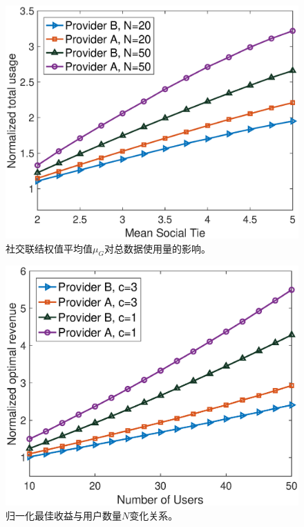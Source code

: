 \begin{figure}[t]
\centering
\includegraphics[scale=0.53]{./pic/normusage2.eps}
\vspace{-0.0cm}
\caption{社交联结权值平均值$\mu_{G}$对总数据使用量的影响。}\label{fg:Fig1}
\end{figure}

\begin{figure}[htb]
\centering
\includegraphics[scale=0.53]{./pic/normrev2.eps}
\vspace{-0.0cm}
\caption{归一化最佳收益与用户数量$N$变化关系。}\label{fg:Fig2}
\end{figure}

